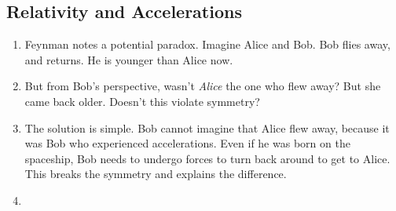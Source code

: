 \subsection{Relativity and Accelerations}

\begin{enumerate}

  \item Feynman notes a potential paradox. Imagine Alice and Bob. Bob
  flies away, and returns. He is younger than Alice now.

  \item But from Bob's perspective, wasn't \emph{Alice} the one who flew
  away? But she came back older. Doesn't this violate symmetry?

  \item The solution is simple. Bob cannot imagine that Alice flew away,
  because it was Bob who experienced accelerations. Even if he was born
  on the spaceship, Bob needs to undergo forces to turn back around to
  get to Alice. This breaks the symmetry and explains the difference.

  \item {}
\end{enumerate}
